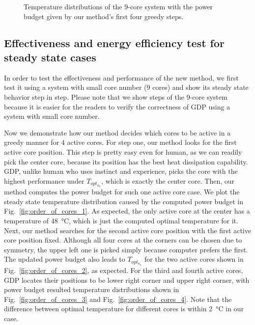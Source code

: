 \begin{figure}
{  }
  \hfill
  \caption{Temperature distributions of the 9-core system with the power budget given by our method's first four greedy steps.}
  \label{fig:order_of_cores}
\end{figure}

\subsection{Effectiveness and energy efficiency test for steady state cases}
In order to test the effectiveness and performance of the new method, we first test it
using a system with small core number ($9$ cores) and show its steady state
behavior step in step. Please note that we show steps of the $9$-core system
because it is easier for the readers to verify the correctness of GDP using
a system with small core number.

Now we demonstrate how our method decides which cores to be active in a
greedy manner for $4$ active cores. For step one, our method looks for the first
active core position. This step is pretty easy even for human, as we
can readily pick the center core, because its position has the best
heat dissipation capability. GDP, unlike human who uses instinct and
experience, picks the core with the highest performance under $T_{opt_{n_{a}}}$, which is exactly the center core. 
Then, our method computes the power
budget for such one active core case. We plot the steady state temperature
distribution caused by the computed power budget in
Fig.~\ref{fig:order_of_cores_1}. As expected, the only active core at
the center has a temperature of \SI{48}{\degreeCelsius}, which is just
the computed optimal temperature for it. Next, our method searches for the
second active core position with the first active core position
fixed. Although all four cores at the corners can be chosen due to
symmetry, the upper left one is picked simply because computer prefers
the first. The updated power budget also leads to
$T_{opt_{n_{a}}}$ for the two active cores shown in Fig.~\ref{fig:order_of_cores_2}, as expected. For the
third and fourth active cores, GDP locates their positions to be 
lower right corner and upper right corner, with power budget
resulted temperature distributions shown in
Fig.~\ref{fig:order_of_cores_3} and Fig.~\ref{fig:order_of_cores_4}. Note that the difference between optimal temperature for different cores is within \SI{2}{\degreeCelsius} in our case.



